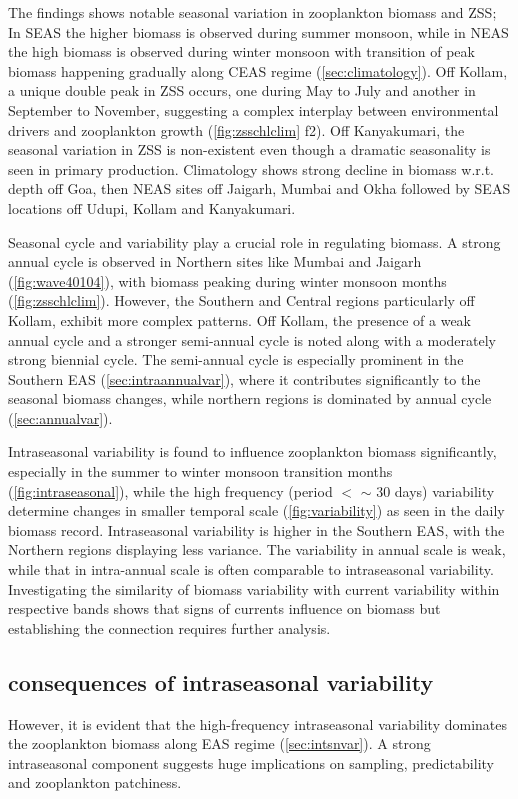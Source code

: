 \documentclass{article}
\begin{document}
	The findings shows notable seasonal variation in zooplankton biomass and ZSS; In SEAS the higher biomass is observed during summer monsoon, while in NEAS the high biomass is observed during winter monsoon with transition of peak biomass happening gradually along CEAS regime (\autoref{sec:climatology}). Off Kollam, a unique double peak in ZSS occurs, one during May to July and another in September to November, suggesting a complex interplay between environmental drivers and zooplankton growth (\cref{fig:zsschlclim} f2). Off Kanyakumari, the seasonal variation in ZSS is non-existent even though a dramatic seasonality is seen in primary production. Climatology shows strong decline in biomass w.r.t. depth off Goa, then NEAS sites off Jaigarh, Mumbai and Okha followed by SEAS locations off Udupi, Kollam and Kanyakumari.
	
	Seasonal cycle and variability play a crucial role in regulating biomass. A strong annual cycle is observed in Northern sites like Mumbai and Jaigarh (\cref{fig:wave40104}), with biomass peaking during winter monsoon months (\cref{fig:zsschlclim}). However, the Southern and Central regions particularly off Kollam, exhibit more complex patterns. Off Kollam, the presence of a weak annual cycle and a stronger semi-annual cycle is noted along with a moderately strong biennial cycle. The semi-annual cycle is especially prominent in the Southern EAS (\autoref{sec:intraannualvar}), where it contributes significantly to the seasonal biomass changes, while northern regions is dominated by annual cycle (\autoref{sec:annualvar}). 
	
	Intraseasonal variability is found to influence zooplankton biomass significantly, especially in the summer to winter monsoon transition months (\cref{fig:intraseasonal}), while the high frequency (period $<$ $\sim$ 30 days) variability determine changes in smaller temporal scale (\cref{fig:variability}) as seen in the daily biomass record. Intraseasonal variability is higher in the Southern EAS, with the Northern regions displaying less variance. The variability in annual scale is weak, while that in intra-annual scale is often comparable to intraseasonal variability. Investigating the similarity of biomass variability with current variability within respective bands shows that signs of currents influence on biomass but establishing the connection requires further analysis.

 	\subsection{consequences of intraseasonal variability}
	However, it is evident that the high-frequency intraseasonal variability dominates the zooplankton biomass along EAS regime (\autoref{sec:intsnvar}). A strong intraseasonal component suggests huge implications on sampling, predictability and zooplankton patchiness.
 
\end{document}
